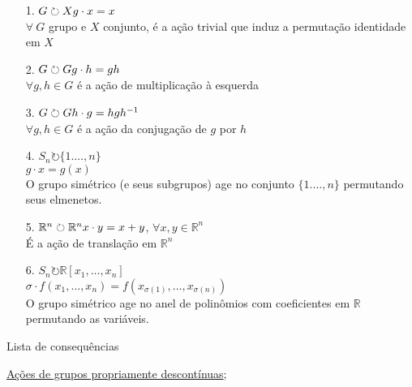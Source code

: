 \begin{ex}
	\begin{itemize}
    
	    \item[1.] $G\circlearrowright X \\
                g\cdot x = x$\\
                $\forall \  G$ grupo e $X$ conjunto, é a ação trivial que induz a permutação identidade em $X$

        \item[2.] $G\circlearrowright G\\
                g\cdot h = gh$\\
                $\forall g,h \in G$ é a ação de multiplicação à esquerda
        
	  \item[3.]  $G\circlearrowright G\\
                h\cdot g = hgh^{-1}$\\
                $\forall g,h \in G$ é a ação da conjugação de $g$ por $h$

        \item[4.] $S_n \circlearrowright \{1.\dots,n\}$\\
                $g\cdot x = g(x)$\\
                O grupo simétrico (e seus subgrupos) age no conjunto $\{1.\dots,n\}$ permutando seus elmenetos.
        
        \item[5.] $\mathbb{R}^n\circlearrowright \mathbb{R}^n\\
                x\cdot y = x+y$, $\forall x,y\in \mathbb{R}^n$\\
                É a ação de translação em $\mathbb{R}^n$

        \item[6.] $S_n \circlearrowright \mathbb{R}[x_1,\dots,x_n]$\\
                $\sigma\cdot f(x_1,\dots,x_n) = f(x_{\sigma(1)},\dots,x_{\sigma(n)})$\\
                O grupo simétrico age no anel de polinômios com coeficientes em $\mathbb{R}$ permutando as variáveis.


    \end{itemize}
\end{ex}
 

\begin{titlemize}{Lista de consequências}
	\item \hyperref[ações-de-grupos-propriamente-descontínuas-def]{Ações de grupos propriamente descontínuas};
\end{titlemize}